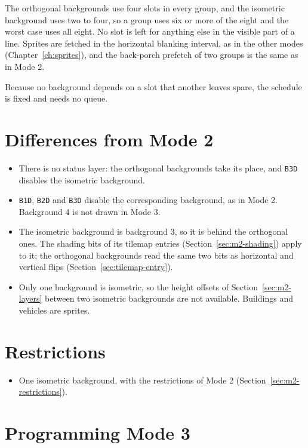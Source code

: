The orthogonal backgrounds use four slots in every group, and the isometric background uses two to four, so a group
uses six or more of the eight and the worst case uses all eight. No slot is left for anything else in the visible part
of a line. Sprites are fetched in the horizontal blanking interval, as in the other modes (Chapter~\ref{ch:sprites}),
and the back-porch prefetch of two groups is the same as in Mode 2.

Because no background depends on a slot that another leaves spare, the schedule is fixed and needs no queue.

\section{Differences from Mode 2}

\begin{itemize}
	\item There is no status layer: the orthogonal backgrounds take its place, and \texttt{B3D} disables the isometric
	      background.
	\item \texttt{B1D}, \texttt{B2D} and \texttt{B3D} disable the corresponding background, as in Mode 2. Background 4 is not drawn in Mode 3.
	\item The isometric background is background 3, so it is behind the orthogonal ones. The shading bits of its tilemap entries
	      (Section~\ref{sec:m2-shading}) apply to it; the orthogonal backgrounds read the same two bits as horizontal and
	      vertical flips (Section~\ref{sec:tilemap-entry}).
	\item Only one background is isometric, so the height offsets of Section~\ref{sec:m2-layers} between two isometric
	      backgrounds are not available. Buildings and vehicles are sprites.
\end{itemize}

\section{Restrictions}

\begin{itemize}
	\item One isometric background, with the restrictions of Mode 2 (Section~\ref{sec:m2-restrictions}).
\end{itemize}

\section{Programming Mode 3}

